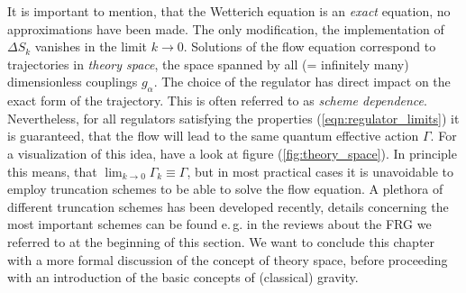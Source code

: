 It is important to mention, that the Wetterich equation is an \textit{exact} equation, no approximations have been made. The only modification, the implementation of $\Delta S_k$ vanishes in the limit $k\rightarrow 0$. Solutions of the flow equation correspond to trajectories in \textit{theory space}, the space spanned by all (= infinitely many) dimensionless couplings $g_{\alpha}$. The choice of the regulator has direct impact on the exact form of the trajectory. This is often referred to as \textit{scheme dependence}. Nevertheless, for all regulators satisfying the properties (\ref{eqn:regulator_limits}) it is guaranteed, that the flow will lead to the same quantum effective action $\Gamma$. For a visualization of this idea, have a look at figure (\ref{fig:theory_space}).  In principle this means, that $\lim_{k\rightarrow 0}\Gamma_k\equiv\Gamma$, but in most practical cases it is unavoidable to employ truncation schemes to be able to solve the flow equation. A plethora of different truncation schemes has been developed recently, details concerning the most important schemes can be found e.\,g. in the reviews about the FRG we referred to at the beginning of this section. We want to conclude this chapter with a more formal discussion of the concept of theory space, before proceeding with an introduction of the basic concepts of (classical) gravity.
